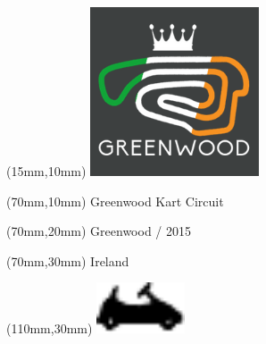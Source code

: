 \null\newpage
\begin{textblock*}{50mm}(15mm,10mm)%
\includegraphics[width=50mm]{LG/GRWO.png}
\end{textblock*}
\begin{textblock*}{130mm}(70mm,10mm)%
{\fontsize{20}{20}\selectfont Greenwood Kart Circuit}\\
\end{textblock*}
\begin{textblock*}{120mm}(70mm,20mm)%
{\fontsize{16}{16}\selectfont Greenwood / 2015}\\
\end{textblock*}
\begin{textblock*}{120mm}(70mm,30mm)%
{\fontsize{12}{12}\selectfont Ireland}
\end{textblock*}
\begin{textblock*}{30mm}(110mm,30mm)%
\centering
\includegraphics[height=15mm]{icons/kart.pdf}
\end{textblock*}
